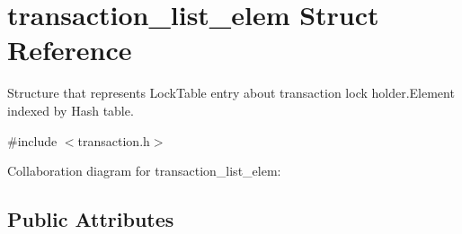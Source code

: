 \hypertarget{structtransaction__list__elem}{\section{transaction\+\_\+list\+\_\+elem Struct Reference}
\label{structtransaction__list__elem}
}


Structure that represents Lock\+Table entry about transaction lock holder.\+Element indexed by Hash table.  




{\ttfamily \#include $<$transaction.\+h$>$}



Collaboration diagram for transaction\+\_\+list\+\_\+elem\+:
\subsection*{Public Attributes}
